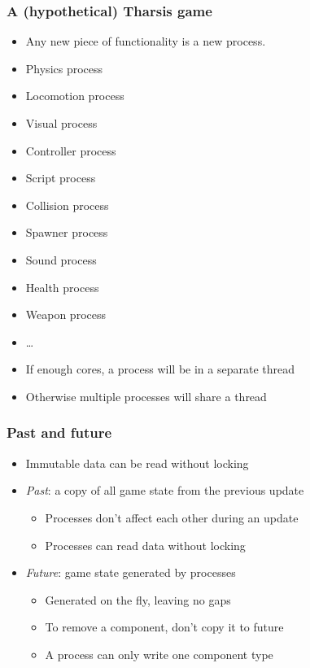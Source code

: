\documentclass[ignorenonframetext,]{beamer}
\begin{document}
\begin{frame}\frametitle{A (hypothetical) Tharsis game}

\begin{itemize}
\item
  Any new piece of functionality is a new process.
\item
  Physics process
\item
  Locomotion process
\item
  Visual process
\item
  Controller process
\item
  Script process
\item
  Collision process
\item
  Spawner process
\item
  Sound process
\item
  Health process
\item
  Weapon process
\item
  \ldots{}
\item
  If enough cores, a process will be in a separate thread
\item
  Otherwise multiple processes will share a thread
\end{itemize}

\end{frame}

\begin{frame}\frametitle{Past and future}

\begin{itemize}
\item
  Immutable data can be read without locking
\item
  \emph{Past}: a copy of all game state from the previous update

  \begin{itemize}
  \item
    Processes don't affect each other during an update
  \item
    Processes can read data without locking
  \end{itemize}

\item
  \emph{Future}: game state generated by processes

  \begin{itemize}
  \item
    Generated on the fly, leaving no gaps
  \item
    To remove a component, don't copy it to future
  \item
    A process can only write one component type
  \end{itemize}
\end{itemize}

\end{frame}
\end{document}
